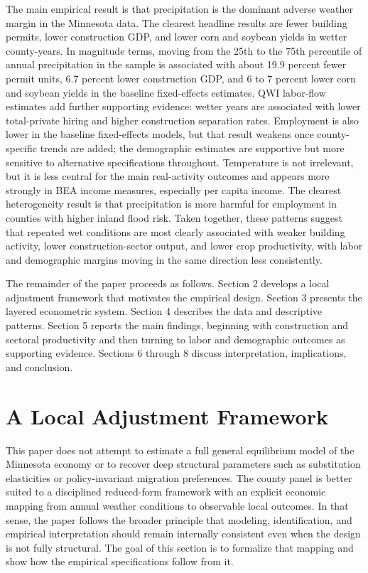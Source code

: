 \documentclass[12pt]{article}
\begin{document}
The main empirical result is that precipitation is the dominant adverse weather margin in the Minnesota data. The clearest headline results are fewer building permits, lower construction GDP, and lower corn and soybean yields in wetter county-years. In magnitude terms, moving from the 25th to the 75th percentile of annual precipitation in the sample is associated with about 19.9 percent fewer permit units, 6.7 percent lower construction GDP, and 6 to 7 percent lower corn and soybean yields in the baseline fixed-effects estimates. QWI labor-flow estimates add further supporting evidence: wetter years are associated with lower total-private hiring and higher construction separation rates. Employment is also lower in the baseline fixed-effects models, but that result weakens once county-specific trends are added; the demographic estimates are supportive but more sensitive to alternative specifications throughout. Temperature is not irrelevant, but it is less central for the main real-activity outcomes and appears more strongly in BEA income measures, especially per capita income. The clearest heterogeneity result is that precipitation is more harmful for employment in counties with higher inland flood risk. Taken together, these patterns suggest that repeated wet conditions are most clearly associated with weaker building activity, lower construction-sector output, and lower crop productivity, with labor and demographic margins moving in the same direction less consistently.

The remainder of the paper proceeds as follows. Section 2 develops a local adjustment framework that motivates the empirical design. Section 3 presents the layered econometric system. Section 4 describes the data and descriptive patterns. Section 5 reports the main findings, beginning with construction and sectoral productivity and then turning to labor and demographic outcomes as supporting evidence. Sections 6 through 8 discuss interpretation, implications, and conclusion.

\section{A Local Adjustment Framework}

This paper does not attempt to estimate a full general equilibrium model of the Minnesota economy or to recover deep structural parameters such as substitution elasticities or policy-invariant migration preferences. The county panel is better suited to a disciplined reduced-form framework with an explicit economic mapping from annual weather conditions to observable local outcomes. In that sense, the paper follows the broader principle that modeling, identification, and empirical interpretation should remain internally consistent even when the design is not fully structural. The goal of this section is to formalize that mapping and show how the empirical specifications follow from it.
\end{document}
